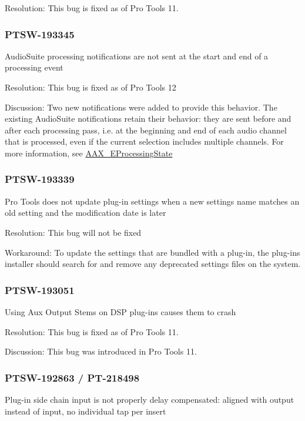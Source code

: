 Resolution\+: This bug is fixed as of Pro Tools 11.\hypertarget{a00846_PTSW-193345}{}\subsubsection{P\+T\+S\+W-\/193345}\label{a00846_PTSW-193345}
Audio\+Suite processing notifications are not sent at the start and end of a processing event

Resolution\+: This bug is fixed as of Pro Tools 12

Discussion\+: Two new notifications were added to provide this behavior. The existing Audio\+Suite notifications retain their behavior\+: they are sent before and after each processing pass, i.\+e. at the beginning and end of each audio channel that is processed, even if the current selection includes multiple channels. For more information, see \mbox{\hyperlink{a00491_a6ec854be40c8cf810dec97de3e56c0a7}{A\+A\+X\+\_\+\+E\+Processing\+State}}\hypertarget{a00846_PTSW-193339}{}\subsubsection{P\+T\+S\+W-\/193339}\label{a00846_PTSW-193339}
Pro Tools does not update plug-\/in settings when a new setting\textquotesingle{}s name matches an old setting and the modification date is later

Resolution\+: This bug will not be fixed

Workaround\+: To update the settings that are bundled with a plug-\/in, the plug-\/in\textquotesingle{}s installer should search for and remove any deprecated settings files on the system.\hypertarget{a00846_PTSW-193051}{}\subsubsection{P\+T\+S\+W-\/193051}\label{a00846_PTSW-193051}
Using Aux Output Stems on D\+SP plug-\/ins causes them to crash

Resolution\+: This bug is fixed as of Pro Tools 11.

Discussion\+: This bug was introduced in Pro Tools 11.\hypertarget{a00846_PTSW-192863}{}\subsubsection{P\+T\+S\+W-\/192863 / P\+T-\/218498}\label{a00846_PTSW-192863}
Plug-\/in side chain input is not properly delay compensated\+: aligned with output instead of input, no individual tap per insert

